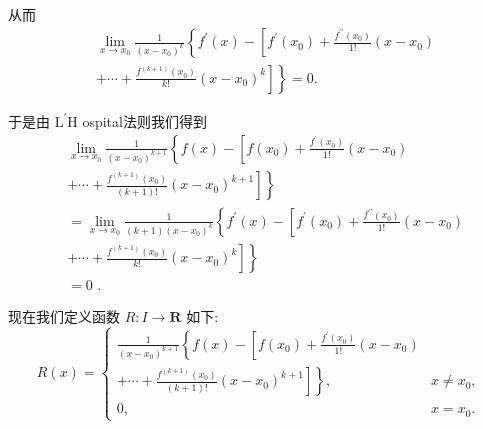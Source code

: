 从而
\begin{align*}
	&\mathop{\lim }\limits_{{x \rightarrow  {x}_{0}}}\frac{1}{{\left( x - {x}_{0}\right) }^{k}}\left\{  {{f}^{\prime }\left( x\right)  - \left\lbrack  {{f}^{\prime }\left( {x}_{0}\right)  + \frac{{f}^{\prime \prime }\left( {x}_{0}\right) }{1!}\left( {x - {x}_{0}}\right) }\right. }\right.\\
	&\left. \left. {+\cdots  + \frac{{f}^{\left( k + 1\right) }\left( {x}_{0}\right) }{k!}{\left( x - {x}_{0}\right) }^{k}}\right\rbrack  \right\}   = 0.
\end{align*}

于是由 ${\mathrm{L}}^{\prime }\mathrm{H}$ ospital法则我们得到
\begin{align*}
	&\mathop{\lim }\limits_{{x \rightarrow  {x}_{0}}}\frac{1}{{\left( x - {x}_{0}\right) }^{k + 1}}\left\{  {f\left( x\right)  - \left\lbrack  {f\left( {x}_{0}\right)  + \frac{{f}^{\prime }\left( {x}_{0}\right) }{1!}\left( {x - {x}_{0}}\right) }\right. }\right.\\
	&\left. \left. {+\cdots  + \frac{{f}^{\left( k + 1\right) }\left( {x}_{0}\right) }{\left( {k + 1}\right) !}{\left( x - {x}_{0}\right) }^{k + 1}}\right\rbrack  \right\}\\
	&= \mathop{\lim }\limits_{{x \rightarrow  {x}_{0}}}\frac{1}{\left( {k + 1}\right) {\left( x - {x}_{0}\right) }^{k}}\left\{  {{f}^{\prime }\left( x\right)  - \left\lbrack  {{f}^{\prime }\left( {x}_{0}\right)  + \frac{{f}^{\prime \prime }\left( {x}_{0}\right) }{1!}\left( {x - {x}_{0}}\right) }\right. }\right.\\
	&\left. \left. {+\cdots  + \frac{{f}^{\left( k + 1\right) }\left( {x}_{0}\right) }{k!}{\left( x - {x}_{0}\right) }^{k}}\right\rbrack  \right\}\\
	&= 0\text{ . }
\end{align*}

现在我们定义函数 $R : I \rightarrow  \mathbf{R}$ 如下:
$$R\left( x\right)  = \left\{  \begin{matrix} \frac{1}{{\left( x - {x}_{0}\right) }^{k + 1}}\left\{  {f\left( x\right)  - \left\lbrack  {f\left( {x}_{0}\right)  + \frac{{f}^{\prime }\left( {x}_{0}\right) }{1!}\left( {x - {x}_{0}}\right) }\right. }\right. & \\  \left. \left. {+\cdots  + \frac{{f}^{\left( k + 1\right) }\left( {x}_{0}\right) }{\left( {k + 1}\right) !}{\left( x - {x}_{0}\right) }^{k + 1}}\right\rbrack  \right\}  , & x \neq  {x}_{0}, \\  0, & x = {x}_{0}. \end{matrix}\right.$$

